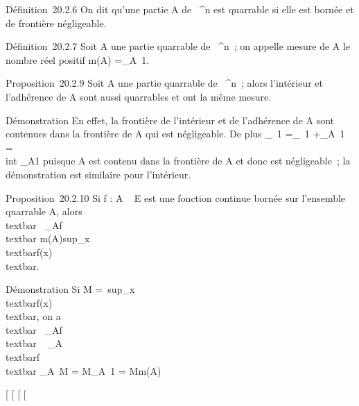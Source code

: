 \documentclass[]{article}
\begin{document}
Définition~20.2.6 On dit qu'une partie A de ~^n est quarrable
si elle est bornée et de frontière négligeable.

Définition~20.2.7 Soit A une partie quarrable de ~^n~; on
appelle mesure de A le nombre réel positif m(A)
=\int  \_A~1.

Proposition~20.2.9 Soit A une partie quarrable de ~^n~; alors
l'intérieur et l'adhérence de A sont aussi quarrables et ont la même
mesure.

Démonstration En effet, la frontière de l'intérieur et de l'adhérence de
A sont contenues dans la frontière de A qui est négligeable. De plus
\int  \_\overlineA~1
=\int  \_\overlineA\diagdownA~1
+\int  \_A~1 =\\int
 \_A1 puisque \overlineA \diagdown A est contenu dans
la frontière de A et donc est négligeable~; la démonstration est
similaire pour l'intérieur.

Proposition~20.2.10 Si f : A \rightarrow~ E est une fonction continue bornée sur
l'ensemble quarrable A, alors
\\textbar{}\int ~
\_Af\\textbar{} \leq
m(A)sup\_x\inA~\\textbar{}f(x)\\textbar{}.

Démonstration Si M =\
sup\_x\inA\\textbar{}f(x)\\textbar{},
on a \\textbar{}\int ~
\_Af\\textbar{} \leq\int ~
\_A\\textbar{}f\\textbar{}
\leq\int  \_A~M =
M\int  \_A~1 = Mm(A)

{[}
{[}
{[}
{[}
\end{document}
